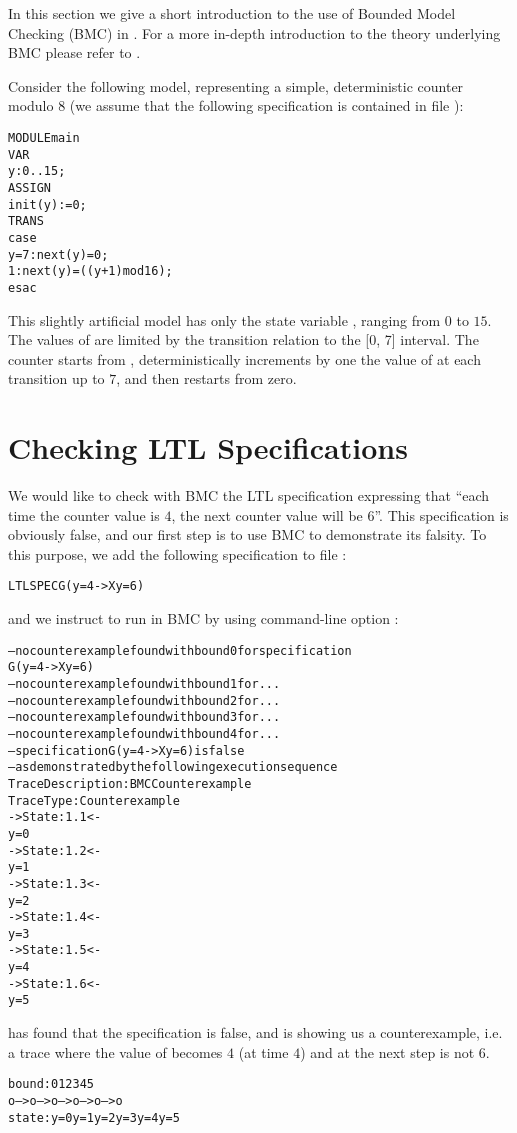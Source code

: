 In this section we give a short introduction to the use of Bounded Model
Checking (BMC) in \nusmv. For a more in-depth 
introduction to the theory underlying BMC please refer to \cite{BCCZ99}.

Consider the following model, representing a simple, deterministic
counter modulo $8$ (we assume that the following specification is 
contained in file ):
\begin{alltt}
MODULE main
VAR 
  y : 0..15;
ASSIGN 
  init(y) := 0;
TRANS
  case
     y = 7 :  next(y) = 0; 
     1     :  next(y) = ((y + 1) mod 16);
  esac
\end{alltt}

This slightly artificial model has only the state variable , ranging
from $0$ to $15$. The values of  are limited by the transition relation
to the [0, 7] interval. The counter starts from , deterministically
increments by one the value of  at each transition up to $7$, and then
restarts from zero. 

\section{Checking LTL Specifications}
\label{Checking LTL Specifications}

We would like to check with BMC the LTL specification  
expressing that ``each time the counter value is $4$, the next counter
value will be $6$''. This specification is obviously false, and our first
step is to use \nusmv BMC to demonstrate its falsity.
To this purpose, we add the following specification to file :
\begin{alltt}
LTLSPEC G ( y=4 -> X y=6 )
\end{alltt}
and we instruct \nusmv to run in BMC by using command-line option :
\begin{alltt}
\shellprompt {}
-- no counterexample found with bound 0 for specification 
   G(y = 4 -> X y = 6)
-- no counterexample found with bound 1 for ... 
-- no counterexample found with bound 2 for ...
-- no counterexample found with bound 3 for ...
-- no counterexample found with bound 4 for ...
-- specification  G (y = 4 ->  X y = 6)   is false
-- as demonstrated by the following execution sequence
Trace Description: BMC Counterexample
Trace Type: Counterexample
-> State: 1.1 <-
  y = 0
-> State: 1.2 <-
  y = 1
-> State: 1.3 <-
  y = 2
-> State: 1.4 <-
  y = 3
-> State: 1.5 <-
  y = 4
-> State: 1.6 <-
  y = 5
\shellprompt
\end{alltt}
\nusmv has found that the specification is false, and is showing us a
counterexample, i.e. a trace where the value of  becomes $4$ (at time
$4$) and at the next step is not $6$.
\begin{alltt}
 bound:   0    1    2    3    4    5
          o--->o--->o--->o--->o--->o
 state:  y=0  y=1  y=2  y=3  y=4  y=5 
\end{alltt}

